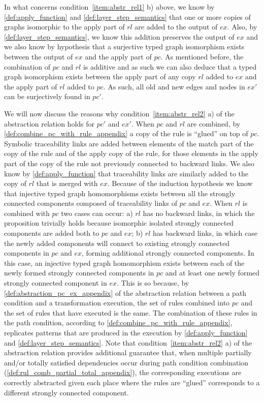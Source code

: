 \begin{ps}
\begin{itemize}
In what concerns condition~\ref{item:abstr_rel1} b) above, we know by \cref{def:apply_function} and \cref{def:layer_step_semantics} that one or more copies of graphs isomorphic to the apply part of $rl$ are added to the output of $ex$. Also, by \cref{def:layer_step_semantics}, we know this addition preserves the output of $ex$ and we also know by hypothesis that a surjective typed graph isomorphism exists between the output of $ex$ and the apply part of $pc$. As mentioned before, the combination of $pc$ and $rl$ is additive and as such we can also deduce that a typed graph isomorphism exists between the apply part of any copy $rl$ added to $ex$ and the apply part of $rl$ added to $pc$. As such, all old and new edges and nodes in $ex'$ can be surjectively found in $pc'$.\vspace{.3cm}

We will now discuss the reasons why condition~\ref{item:abstr_rel2} a) of the abstraction relation holds for $pc'$ and $ex'$. When $pc$ and $rl$ are combined, by \cref{def:combine_pc_with_rule_appendix} a copy of the rule is ``glued'' on top of $pc$. Symbolic traceability links are added between elements of the match part of the copy of the rule and of the apply copy of the rule, for those elements in the apply part of the copy of the rule not previously connected to backward links. We also know by \cref{def:apply_function} that traceability links are similarly added to the copy of $rl$ that is merged with $ex$. Because of the induction hypothesis we know that injective typed graph homomorphisms exists between all the strongly connected components composed of traceability links of $pc$ and $ex$. When $rl$ is combined with $pc$ two cases can occur: a) $rl$ has no backward links, in which the proposition trivially holds because isomorphic isolated strongly connected components are added both to $pc$ and $ex$; b) $rl$ has backward links, in which case the newly added components will connect to existing strongly connected components in $pc$ and $ex$, forming additional strongly connected components. In this case, an injective typed graph homomorphism exists between each of the newly formed strongly connected components in $pc$ and at least one newly formed strongly connected component in $ex$. This is so because, by \cref{def:abstraction_pc_ex_appendix} of the abstraction relation between a path condition and a transformation execution, the set of rules combined into $pc$ and the set of rules that have executed is the same. The combination of these rules in the path condition, according to \cref{def:combine_pc_with_rule_appendix}, replicates patterns that are produced in the execution by \cref{def:apply_function} and \cref{def:layer_step_semantics}. Note that condition~\ref{item:abstr_rel2} a) of the abstraction relation provides additional guarantee that, when multiple partially and/or totally satisfied dependencies occur during path condition combination (\cref{def:rul_comb_partial_total_appendix}), the corresponding executions are correctly abstracted given each place where the rules are ``glued'' corresponds to a different strongly connected component.\vspace{.3cm}
 

\end{itemize}
\end{ps}
